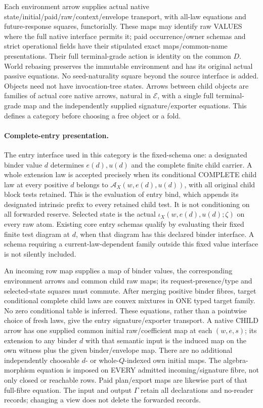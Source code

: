 \documentclass[11pt]{article}
\begin{document}
Each environment arrow supplies actual native state/initial/paid/raw/context/envelope transport, with all-law equations and future-response squares, functorially. These maps may identify raw VALUES where the full native interface permits it; paid occurrence/owner schemas and strict operational fields have their stipulated exact maps/common-name presentations. Their full terminal-grade action is identity on the common $D$. World rebasing preserves the immutable environment and has its original actual passive equations. No seed-naturality square beyond the source interface is added. Objects need not have invocation-tree states. Arrows between child objects are families of actual core native arrows, natural in $\mathcal E$, with a single full terminal-grade map and the independently supplied signature/exporter equations. This defines a category before choosing a free object or a fold.

\paragraph{Complete-entry presentation.}
The entry interface used in this category is the fixed-schema one: a designated binder value $d$ determines $e(d),u(d)$ and the complete finite child carrier. A whole extension law is accepted precisely when its conditional COMPLETE child law at every positive $d$ belongs to $\mathcal A_X(w,e(d),u(d))$, with all original child block tests retained. This is the evaluation of entry bind, which appends its designated intrinsic prefix to every retained child test. It is not conditioning on all forwarded reserve. Selected state is the actual $\iota_X(w,e(d),u(d);\zeta)$ on every raw atom. Existing core entry schemas qualify by evaluating their fixed finite test diagram at $d$, when that diagram has this declared binder interface. A schema requiring a current-law-dependent family outside this fixed value interface is not silently included.

An incoming row map supplies a map of binder values, the corresponding environment arrows and common child raw maps; its request-presence/type and selected-state squares must commute. After merging positive binder fibres, target conditional complete child laws are convex mixtures in ONE typed target family. No zero conditional table is inferred. These equations, rather than a pointwise choice of fresh laws, give the entry signature/exporter transport. A native CHILD arrow has one supplied common initial raw/coefficient map at each $(w,e,s)$; its extension to any binder $d$ with that semantic input is the induced map on the own witness plus the given binder/envelope map. There are no additional independently choosable $d$- or whole-$Q$-indexed own initial maps. The algebra-morphism equation is imposed on EVERY admitted incoming/signature fibre, not only closed or reachable rows. Paid plan/export maps are likewise part of that full-fibre equation. The input and output $\Gamma$ retain all declarations and no-reader records; changing a view does not delete the forwarded records.
\end{document}
